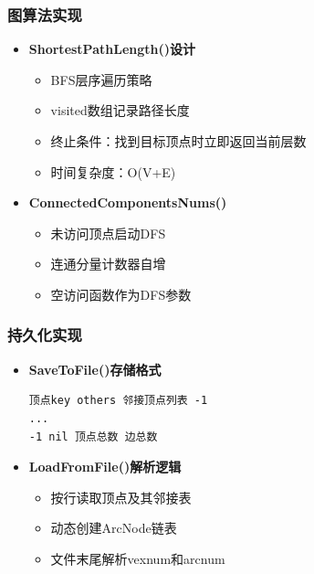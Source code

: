 \documentclass[supercite]{Experimental_Report}
\theoremstyle{definition}
\begin{document}
\subsubsection*{图算法实现}
\begin{itemize}
    \item \textbf{ShortestPathLength()设计}
    \begin{itemize}
        \item BFS层序遍历策略
        \item visited数组记录路径长度
        \item 终止条件：找到目标顶点时立即返回当前层数
        \item 时间复杂度：O(V+E)
    \end{itemize}
    
    \item \textbf{ConnectedComponentsNums()}
    \begin{itemize}
        \item 未访问顶点启动DFS
        \item 连通分量计数器自增
        \item 空访问函数作为DFS参数
    \end{itemize}
\end{itemize}

\subsubsection*{持久化实现}
\begin{itemize}
    \item \textbf{SaveToFile()存储格式}
    \begin{verbatim}
顶点key others 邻接顶点列表 -1
...
-1 nil 顶点总数 边总数
    \end{verbatim}
    
    \item \textbf{LoadFromFile()解析逻辑}
    \begin{itemize}
        \item 按行读取顶点及其邻接表
        \item 动态创建ArcNode链表
        \item 文件末尾解析vexnum和arcnum
    \end{itemize}
\end{itemize}
\end{document}
